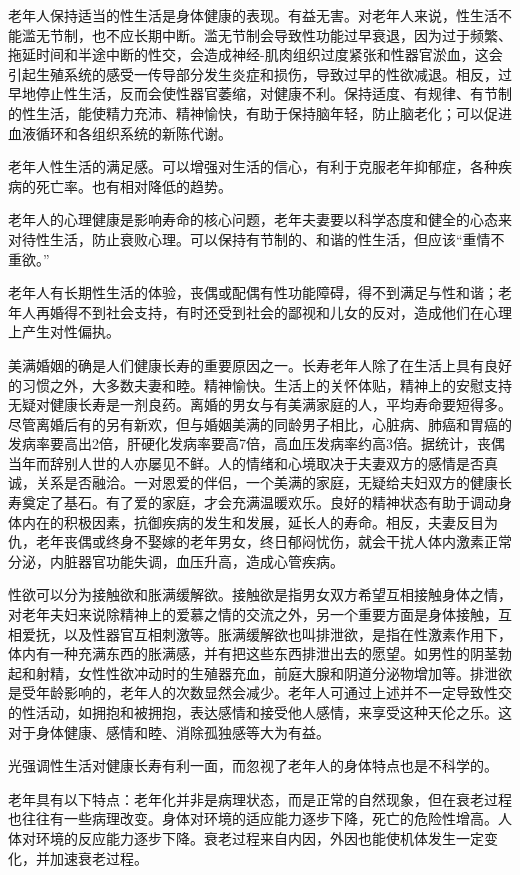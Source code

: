 \documentclass[12pt,UTF8]{ctexbook}
\begin{document}
老年人保持适当的性生活是身体健康的表现。有益无害。对老年人来说，性生活不能滥无节制，也不应长期中断。滥无节制会导致性功能过早衰退，因为过于频繁、拖延时间和半途中断的性交，会造成神经-肌肉组织过度紧张和性器官淤血，这会引起生殖系统的感受一传导部分发生炎症和损伤，导致过早的性欲减退。相反，过早地停止性生活，反而会使性器官萎缩，对健康不利。保持适度、有规律、有节制的性生活，能使精力充沛、精神愉快，有助于保持脑年轻，防止脑老化；可以促进血液循环和各组织系统的新陈代谢。

老年人性生活的满足感。可以增强对生活的信心，有利于克服老年抑郁症，各种疾病的死亡率。也有相对降低的趋势。

老年人的心理健康是影响寿命的核心问题，老年夫妻要以科学态度和健全的心态来对待性生活，防止衰败心理。可以保持有节制的、和谐的性生活，但应该“重情不重欲。”

老年人有长期性生活的体验，丧偶或配偶有性功能障碍，得不到满足与性和谐；老年人再婚得不到社会支持，有时还受到社会的鄙视和儿女的反对，造成他们在心理上产生对性偏执。

美满婚姻的确是人们健康长寿的重要原因之一。长寿老年人除了在生活上具有良好的习惯之外，大多数夫妻和睦。精神愉快。生活上的关怀体贴，精神上的安慰支持无疑对健康长寿是一剂良药。离婚的男女与有美满家庭的人，平均寿命要短得多。尽管离婚后有的另有新欢，但与婚姻美满的同龄男子相比，心脏病、肺癌和胃癌的发病率要高出2倍，肝硬化发病率要高7倍，高血压发病率约高3倍。据统计，丧偶当年而辞别人世的人亦屡见不鲜。人的情绪和心境取决于夫妻双方的感情是否真诚，关系是否融洽。一对恩爱的伴侣，一个美满的家庭，无疑给夫妇双方的健康长寿奠定了基石。有了爱的家庭，才会充满温暖欢乐。良好的精神状态有助于调动身体内在的积极因素，抗御疾病的发生和发展，延长人的寿命。相反，夫妻反目为仇，老年丧偶或终身不娶嫁的老年男女，终日郁闷忧伤，就会干扰人体内激素正常分泌，内脏器官功能失调，血压升高，造成心管疾病。

性欲可以分为接触欲和胀满缓解欲。接触欲是指男女双方希望互相接触身体之情，对老年夫妇来说除精神上的爱慕之情的交流之外，另一个重要方面是身体接触，互相爱抚，以及性器官互相刺激等。胀满缓解欲也叫排泄欲，是指在性激素作用下，体内有一种充满东西的胀满感，并有把这些东西排泄出去的愿望。如男性的阴茎勃起和射精，女性性欲冲动时的生殖器充血，前庭大腺和阴道分泌物增加等。排泄欲是受年龄影响的，老年人的次数显然会减少。老年人可通过上述并不一定导致性交的性活动，如拥抱和被拥抱，表达感情和接受他人感情，来享受这种天伦之乐。这对于身体健康、感情和睦、消除孤独感等大为有益。

光强调性生活对健康长寿有利一面，而忽视了老年人的身体特点也是不科学的。

老年具有以下特点：老年化并非是病理状态，而是正常的自然现象，但在衰老过程也往往有一些病理改变。身体对环境的适应能力逐步下降，死亡的危险性增高。人体对环境的反应能力逐步下降。衰老过程来自内因，外因也能使机体发生一定变化，并加速衰老过程。
\end{document}
